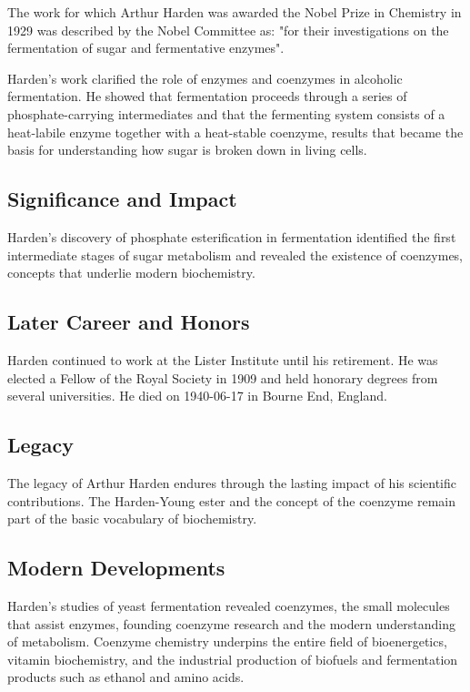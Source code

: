 The work for which Arthur Harden was awarded the Nobel Prize in Chemistry in 1929 was described by the Nobel Committee as: "for their investigations on the fermentation of sugar and fermentative enzymes".

Harden's work clarified the role of enzymes and coenzymes in alcoholic fermentation.
He showed that fermentation proceeds through a series of phosphate-carrying intermediates and that the fermenting system consists of a heat-labile enzyme together with a heat-stable coenzyme, results that became the basis for understanding how sugar is broken down in living cells.

\subsection*{Significance and Impact}

Harden's discovery of phosphate esterification in fermentation identified the first intermediate stages of sugar metabolism and revealed the existence of coenzymes, concepts that underlie modern biochemistry.

\subsection*{Later Career and Honors}

Harden continued to work at the Lister Institute until his retirement.
He was elected a Fellow of the Royal Society in 1909 and held honorary degrees from several universities.
He died on 1940-06-17 in Bourne End, England.

\subsection*{Legacy}

The legacy of Arthur Harden endures through the lasting impact of his scientific contributions.
The Harden-Young ester and the concept of the coenzyme remain part of the basic vocabulary of biochemistry.

\subsection*{Modern Developments}

Harden's studies of yeast fermentation revealed coenzymes, the small molecules that assist enzymes, founding coenzyme research and the modern understanding of metabolism. Coenzyme chemistry underpins the entire field of bioenergetics, vitamin biochemistry, and the industrial production of biofuels and fermentation products such as ethanol and amino acids.

